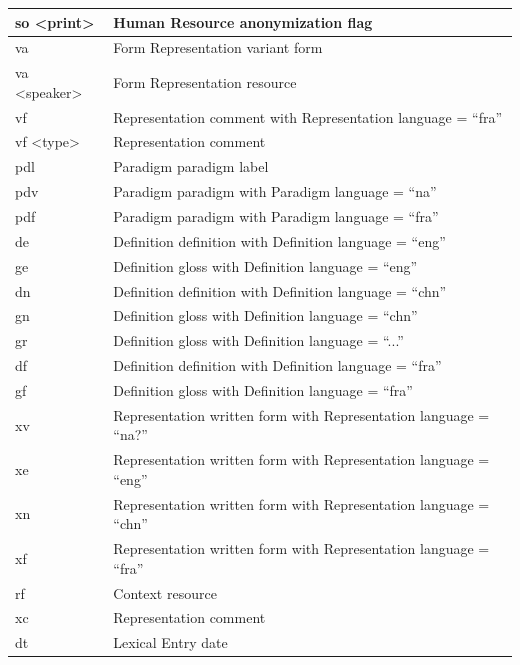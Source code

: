 \documentclass[a4paper,12pt]{article}
\begin{document}
\begin{center}
\begin{longtable}{|p{4cm}|p{11cm}|}
so \textless print\textgreater & Human Resource anonymization flag \\ \hline
va & Form Representation variant form \\ \hline
va \textless speaker\textgreater & Form Representation resource \\ \hline
vf & Representation comment with Representation language = ``fra''  \\ \hline
vf \textless type\textgreater & Representation comment \\ \hline
pdl & Paradigm paradigm label \\ \hline
pdv & Paradigm paradigm with Paradigm language = ``na'' \\ \hline
pdf & Paradigm paradigm with Paradigm language = ``fra'' \\ \hline
de & Definition definition with Definition language = ``eng'' \\ \hline
ge & Definition gloss with Definition language = ``eng'' \\ \hline
dn & Definition definition with Definition language = ``chn'' \\ \hline
gn & Definition gloss with Definition language = ``chn'' \\ \hline
gr & Definition gloss with Definition language = ``...'' \\ \hline
df & Definition definition with Definition language = ``fra'' \\ \hline
gf & Definition gloss with Definition language = ``fra'' \\ \hline
xv & Representation written form with Representation language = ``na?'' \\ \hline
xe & Representation written form with Representation language = ``eng'' \\ \hline
xn & Representation written form with Representation language = ``chn'' \\ \hline
xf & Representation written form with Representation language = ``fra'' \\ \hline
rf & Context resource \\ \hline
xc & Representation comment \\ \hline
dt & Lexical Entry date \\ \hline
\end{longtable}
\end{center}

\pagebreak
\end{document}
